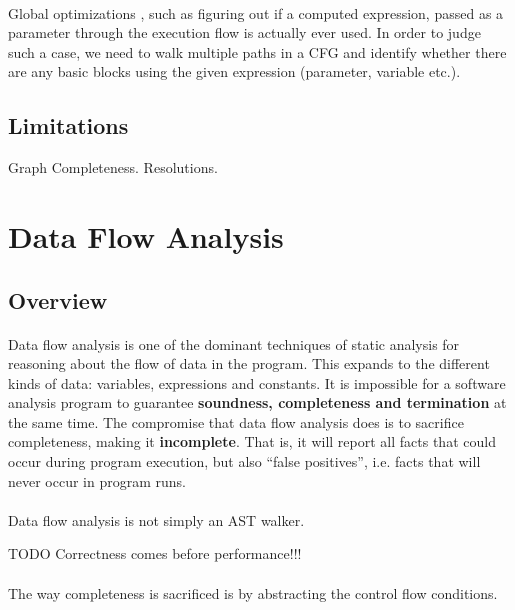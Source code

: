 \paragraph*{}
Global optimizations \cite[need to analyze the entire control flow graph of a program]{cfg-dcc}, such as figuring out if a computed expression, passed as a parameter through the execution flow is actually ever used. In order to judge such a case, we need to walk multiple paths in a CFG and identify whether there are any basic blocks using the given expression (parameter, variable etc.).

\subsection{Limitations}
Graph Completeness. Resolutions.

\section{Data Flow Analysis}
\subsection{Overview}
\paragraph*{}
Data flow analysis is one of the dominant techniques of static analysis for reasoning about the flow of data in the program. This expands to the different kinds of data: variables, expressions and constants. It is impossible for a software analysis program to guarantee \textbf{soundness, completeness and termination} at the same time. The compromise that data flow analysis does is to sacrifice completeness, making it \textbf{incomplete}. That is, it will report all facts that could occur during program execution, but also ``false positives'', i.e. facts that will never occur in program runs.

\paragraph*{}
Data flow analysis is not simply an AST walker.

TODO Correctness comes before performance!!!

\paragraph*{}
The way completeness is sacrificed is by abstracting the control flow conditions.

